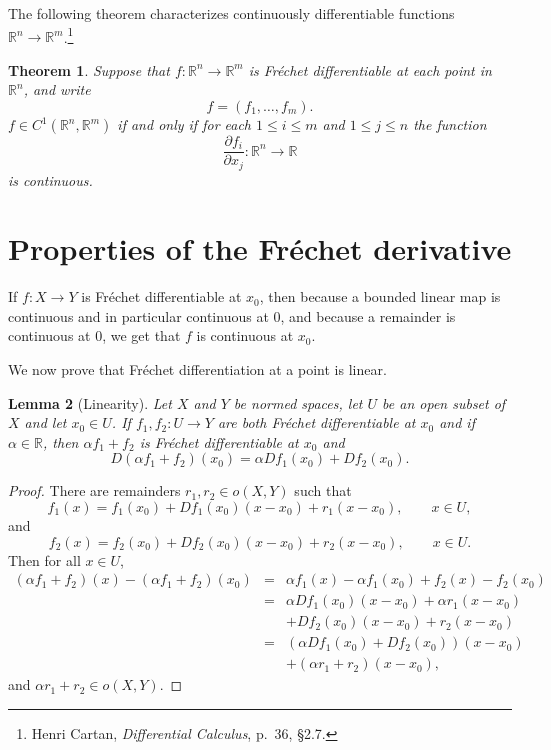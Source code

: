 \documentclass{article}
\newtheorem{theorem}{Theorem}
\newtheorem{lemma}[theorem]{Lemma}
\theoremstyle{definition}
\begin{document}
The following theorem characterizes continuously differentiable functions $\mathbb{R}^n \to \mathbb{R}^m$.\footnote{Henri
Cartan, {\em Differential Calculus}, p.~36, \S 2.7.}

\begin{theorem}
Suppose that $f:\mathbb{R}^n \to \mathbb{R}^m$ is Fr\'echet differentiable at each point in $\mathbb{R}^n$, and write
\[
f=(f_1,\ldots,f_m).
\]
$f \in C^1(\mathbb{R}^n,\mathbb{R}^m)$ if and only if for each  $1 \leq i \leq m$ and
$1 \leq j \leq n$ the function
\[
\frac{\partial f_i}{\partial x_j}:\mathbb{R}^n \to \mathbb{R} 
\]
is continuous.
\end{theorem}


\section{Properties of the Fr\'echet derivative}
\label{properties}
If $f:X \to Y$ is Fr\'echet differentiable at $x_0$, then because a bounded linear map is continuous and in particular
continuous at $0$, and because a remainder is continuous at $0$, we get that $f$ is continuous
at $x_0$.

We now prove that Fr\'echet differentiation at a point is linear.

\begin{lemma}[Linearity]
Let $X$ and $Y$ be normed spaces, let $U$ be an open subset of $X$ and let $x_0 \in U$.  If $f_1,f_2:U \to Y$  are both
Fr\'echet differentiable at $x_0$ and if $\alpha \in \mathbb{R}$,
then $\alpha f_1+f_2$ is Fr\'echet differentiable at $x_0$ and
\[
D(\alpha f_1+f_2)(x_0)=\alpha Df_1(x_0)+Df_2(x_0).
\]
\end{lemma}
\begin{proof}
There are remainders $r_1,r_2 \in o(X,Y)$ such that 
\[
f_1(x)=f_1(x_0)+Df_1(x_0)(x-x_0)+r_1(x-x_0), \qquad x \in U,
\]
and
\[
f_2(x)=f_2(x_0)+Df_2(x_0)(x-x_0)+r_2(x-x_0), \qquad x \in U.
\]
Then for all $x \in U$,
\begin{eqnarray*}
(\alpha f_1+f_2)(x)-(\alpha f_1+f_2)(x_0)&=&\alpha f_1(x)-\alpha f_1(x_0)+f_2(x)-f_2(x_0)\\
&=&\alpha Df_1(x_0)(x-x_0)+ \alpha r_1(x-x_0)\\
&&+Df_2(x_0)(x-x_0)+r_2(x-x_0)\\
&=&(\alpha Df_1(x_0)+Df_2(x_0))(x-x_0)\\
&&+(\alpha r_1+r_2)(x-x_0),
\end{eqnarray*}
and $\alpha r_1+r_2 \in o(X,Y)$.
\end{proof}
\end{document}
